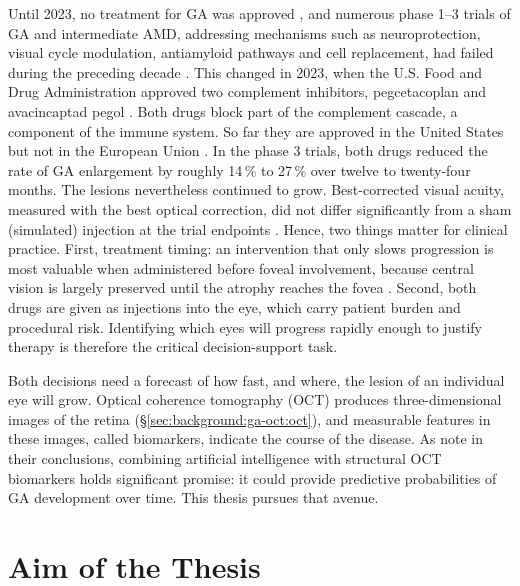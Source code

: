 Until 2023, no treatment for GA was approved \citep{Trincao2024}, and numerous phase 1--3 trials of GA and intermediate AMD,
addressing mechanisms such as neuroprotection, visual cycle modulation,
antiamyloid pathways and cell replacement, had failed during the preceding
decade \citep{Lad2023}. This changed in 2023, when the U.S. Food and Drug
Administration approved two complement inhibitors, pegcetacoplan and
avacincaptad pegol \citep{Singh2025,Trincao2024}. Both drugs block part of
the complement cascade, a component of the immune system. So far they are
approved in the United States but not in the European Union
\citep{EMA2024Syfovre,EMA2024Izelvay}.
In the phase 3 trials, both drugs reduced the rate of GA enlargement by
roughly 14\,\% to 27\,\% over twelve to twenty-four months. The lesions
nevertheless continued to grow. Best-corrected visual acuity, measured
with the best optical correction, did not differ significantly from a
sham (simulated) injection at the trial endpoints \citep{Lad2023}. Hence,
two things matter for clinical practice. First, treatment timing: an intervention that only slows progression is
most valuable when administered before foveal involvement, because central
vision is largely preserved until the atrophy reaches the fovea
\citep{Boyer2017,Vallino2024}. Second, both drugs are given as injections into the eye, which carry
patient burden and procedural risk. Identifying which eyes will progress
rapidly enough to justify therapy is therefore the critical
decision-support task.

Both decisions need a forecast of how fast, and where, the lesion of an
individual eye will grow. Optical coherence tomography (OCT) produces
three-dimensional images of the retina
(\S\ref{sec:background:ga-oct:oct}), and measurable features in these
images, called biomarkers, indicate the course of the disease. As
\citet{Vallino2024} note in their conclusions, combining artificial
intelligence with structural OCT biomarkers holds significant promise: it
could provide predictive probabilities of GA development over time. This
thesis pursues that avenue.


\section{Aim of the Thesis}
\label{sec:introduction:problem}


